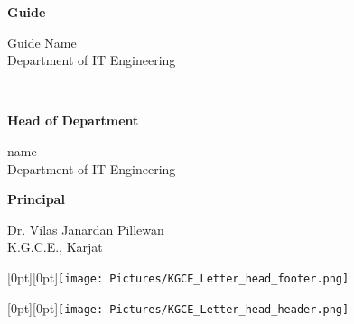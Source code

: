 \documentclass[12pt, a4paper, oneside]{Thesis} %
\begin{document}
{\begin{minipage}{0.5\textwidth}
\begin{flushleft}
	\end{flushleft}
\end{minipage}
\begin{minipage}{0.5\textwidth}
	{\begin{center} \large
		\textbf{Guide}
		\begin{center}
			{\textlangle Guide Name \textrangle \\ %
			\normalsize{Department of IT Engineering}}
		\end{center}
	\end{center}}
\end{minipage}\\[1.75cm]
\begin{minipage}{0.5\textwidth}
	\begin{flushleft} 
		{\begin{center} \large
		\textbf{Head of Department}
		\begin{center}
			{\textlangle name\textrangle \\ 
			\normalsize{Department of IT Engineering}}
		\end{center}
	\end{center}}
	\end{flushleft}
\end{minipage}
\begin{minipage}{0.5\textwidth}
	{\begin{center} \large
		\textbf{Principal}
		\begin{center}
			{Dr. Vilas Janardan Pillewan\\ 
			\normalsize{K.G.C.E., Karjat}}\\[1.5cm]
		\end{center}
	\end{center}}
\end{minipage}

 \raisebox{-1\height}[0pt][0pt]{\texttt{[image: Pictures/KGCE\_Letter\_head\_footer.png]}} 
}


\clearpage %
\raisebox{0.0\height}[0pt][0pt]{\texttt{[image: Pictures/KGCE\_Letter\_head\_header.png]}}
\end{document}
